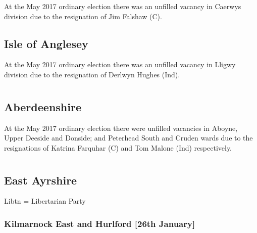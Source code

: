 \documentclass[a4paper,openany]{book}
\begin{document}
\begin{resultsiii}
At the May 2017 ordinary election there was an unfilled vacancy in Caerwys division due to the resignation of Jim Falshaw (C).

\subsection*{Isle of Anglesey}

At the May 2017 ordinary election there was an unfilled vacancy in Lligwy division due to the resignation of Derlwyn Hughes (Ind).

\section[Aberdeen City and Shire]{}

\subsection*{Aberdeenshire}

At the May 2017 ordinary election there were unfilled vacancies in Aboyne, Upper Deeside and Donside; and Peterhead South and Cruden wards due to the resignations of Katrina Farquhar (C) and Tom Malone (Ind) respectively.

\section[Ayrshire Councils]{}

\subsection*{East Ayrshire}

Libtn = Libertarian Party

\subsubsection*{Kilmarnock East and Hurlford \hspace*{\fill}\nolinebreak[1]%
\enspace\hspace*{\fill}
[26th January]}


\end{resultsiii}
\end{document}
